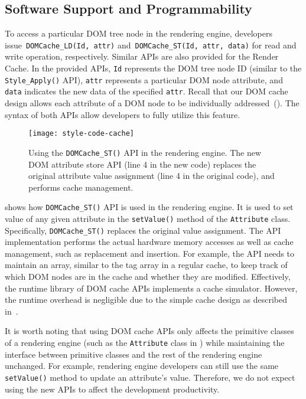 \subsection{Software Support and Programmability}
\label{sec:cache:sw}

To access a particular DOM tree node in the rendering engine, developers issue~\texttt{DOMCache\_LD(Id, attr)} and~\texttt{DOMCache\_ST(Id, attr, data)} for read and write operation, respectively. Similar APIs are also provided for the Render Cache. In the provided APIs, \texttt{Id} represents the DOM tree node ID (similar to the \texttt{Style\_Apply()} API), \texttt{attr} represents a particular DOM node attribute, and \texttt{data} indicates the new data of the specified \texttt{attr}. Recall that our DOM cache design allows each attribute of a DOM node to be individually addressed~(). The syntax of both APIs allow developers to fully utilize this feature.

\begin{figure}[t]
\centering
\captionsetup{width=\columnwidth}
\texttt{[image: style-code-cache]}
\caption{Using the \texttt{DOMCache\_ST()} API in the rendering engine. The new DOM attribute store API (line 4 in the new code) replaces the original attribute value assignment (line 4 in the original code), and performs cache management.}
\label{fig:style-code-cache}
\end{figure}

 shows how \texttt{DOMCache\_ST()} API is used in the rendering engine. It is used to set value of any given attribute in the \texttt{setValue()} method of the \texttt{Attribute} class. Specifically, \texttt{DOMCache\_ST()} replaces the original value assignment. The API implementation performs the actual hardware memory accesses as well as cache management, such as replacement and insertion. For example, the API needs to maintain an array, similar to the tag array in a regular cache, to keep track of which DOM nodes are in the cache and whether they are modified.  Effectively, the runtime library of DOM cache APIs implements a cache simulator. However, the runtime overhead is negligible due to the simple cache design as described in~.

It is worth noting that using DOM cache APIs only affects the primitive classes of a rendering engine (such as the \texttt{Attribute} class in ) while maintaining the interface between primitive classes and the rest of the rendering engine unchanged. For example, rendering engine developers can still use the same \texttt{setValue()} method to update an attribute's value. Therefore, we do not expect using the new APIs to affect the development productivity.

